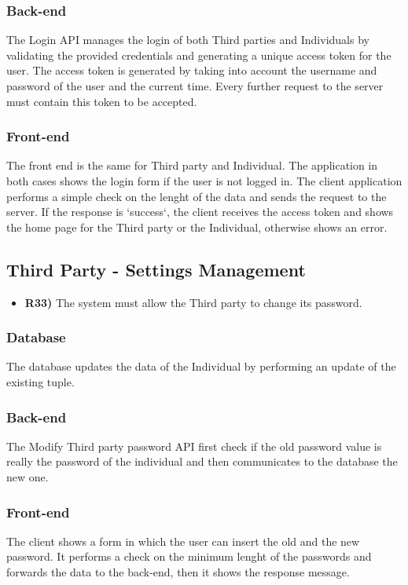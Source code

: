 \subsubsection*{Back-end}
The Login API manages the login of both Third parties and Individuals by validating the provided credentials and generating a unique access token for the user. 
The access token is generated by taking into account the username and password of the user and the current time.
Every further request to the server must contain this token to be accepted.

\subsubsection*{Front-end}
The front end is the same for Third party and Individual. The application in both cases shows the login form if the user is not logged in.
The client application performs a simple check on the lenght of the data and sends the request to the server. If the response is `success`, the client receives the access token and shows the home page for the Third party or the Individual, otherwise shows an error.

\subsection{Third Party - Settings Management}
\begin{itemize}
	\item {\color{Green}\textbf{R33)}} The system must allow the Third party to change its password.
\end{itemize}
\subsubsection*{Database}
The database updates the data of the Individual by performing an update of the existing tuple.

\subsubsection*{Back-end}
The Modify Third party password API first check if the old password value is really the password of the individual and then communicates to the database the new one. 

\subsubsection*{Front-end}
The client shows a form in which the user can insert the old and the new password. It performs a check on the minimum lenght of the passwords and forwards the data to the back-end, then it shows the response message.

